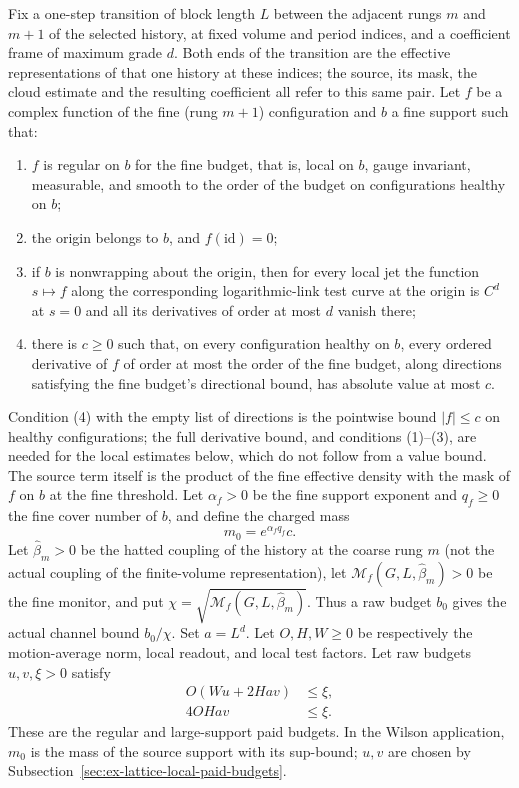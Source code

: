 Fix a one-step transition of block length \(L\) between the adjacent
rungs \(m\) and \(m+1\) of the selected history, at fixed volume and period
indices, and a coefficient frame of
maximum grade \(d\). Both ends of the transition are the effective
representations of that one history at these indices; the source, its
mask, the cloud estimate and the resulting coefficient all refer to this
same pair. Let \(f\) be a complex function of the fine (rung \(m+1\))
configuration and \(b\) a fine support such that:
\begin{enumerate}
\item \(f\) is regular on \(b\) for the fine budget, that is, local on
\(b\), gauge invariant, measurable, and smooth to the order of the budget
on configurations healthy on \(b\);
\item the origin belongs to \(b\), and \(f(\mathrm{id})=0\);
\item if \(b\) is nonwrapping about the origin, then for every local jet
the function \(s\mapsto f\) along the corresponding logarithmic-link test
curve at the origin is \(C^d\) at \(s=0\) and all its derivatives of order
at most \(d\) vanish there;
\item there is \(c\geq0\) such that, on every configuration healthy on
\(b\), every ordered derivative of \(f\) of order at most the order of
the fine budget, along directions satisfying the fine budget's
directional bound, has absolute value at most \(c\).
\end{enumerate}
Condition (4) with the empty list of directions is the pointwise bound
\(|f|\le c\) on healthy configurations; the full derivative bound, and
conditions (1)--(3), are needed for the local estimates below, which do
not follow from a value bound. The source term itself is the product of
the fine effective density with the mask of \(f\) on \(b\) at the fine
threshold. Let \(\alpha_f>0\) be the fine support
exponent and \(q_f\geq0\) the fine cover number of \(b\), and define the
charged mass
\[
 m_0=e^{\alpha_f q_f}c.
\]
Let \(\widehat\beta_m>0\) be the hatted coupling of the history at the
coarse rung \(m\) (not the actual coupling of the finite-volume
representation), let
\(\mathcal M_f(G,L,\widehat\beta_m)>0\) be the fine monitor, and put
\(\chi=\sqrt{\mathcal M_f(G,L,\widehat\beta_m)}\). Thus a raw budget \(b_0\)
gives the actual channel bound \(b_0/\chi\). Set \(a=L^d\). Let
\(O,H,W\geq0\) be respectively the motion-average norm, local readout,
and local test factors. Let raw budgets \(u,v,\xi>0\) satisfy
\begin{align}
 O(Wu+2Hav)&\leq \xi, \label{eq:ex-lattice-regular-small-budget}\\
 4OHav&\leq \xi. \label{eq:ex-lattice-regular-large-budget}
\end{align}
These are the regular and large-support paid budgets. In the Wilson
application, \(m_0\) is the mass of the source support with its sup-bound;
\(u,v\) are chosen by Subsection~\ref{sec:ex-lattice-local-paid-budgets}.

